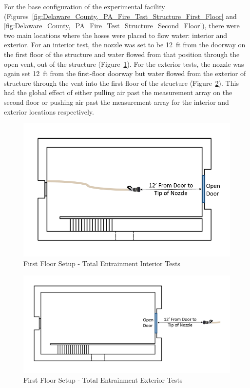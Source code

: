 \documentclass[12pt,oneside]{book}
\begin{document}
For the base configuration of the experimental facility (Figures~\ref{fig:Delaware_County,_PA_Fire_Test_Structure_First_Floor} and \ref{fig:Delaware_County,_PA_Fire_Test_Structure_Second_Floor}), there were two main locations where the hoses were placed to flow water: interior and exterior. For an interior test, the nozzle was set to be 12~ft from the doorway on the first floor of the structure and water flowed from that position through the open vent, out of the structure (Figure~\ref{fig:First_Floor_Setup_Total_Entrainment_Interior_Tests}). For the exterior tests, the nozzle was again set 12~ft from the first-floor doorway but water flowed from the exterior of structure through the vent into the first floor of the structure (Figure~\ref{fig:First_Floor_Setup_Total_Entrainment_Exterior_Tests}). This had the global effect of either pulling air past the measurement array on the second floor or pushing air past the measurement array for the interior and exterior locations respectively.

\begin{figure}[!ht]
	\centering
	\includegraphics[width=.6\columnwidth]{Figures/Air_Entrainment/Measurement_Locations_Firstfloor}
	\caption{First Floor Setup - Total Entrainment Interior Tests}
	\label{fig:First_Floor_Setup_Total_Entrainment_Interior_Tests}
\end{figure}

\begin{figure}[!ht]
	\centering
	\includegraphics[width=.95\columnwidth]{Figures/Air_Entrainment/Measurement_Locations_Firstfloor_Ext}
	\caption{First Floor Setup - Total Entrainment Exterior Tests}
	\label{fig:First_Floor_Setup_Total_Entrainment_Exterior_Tests}
\end{figure}
\end{document}
